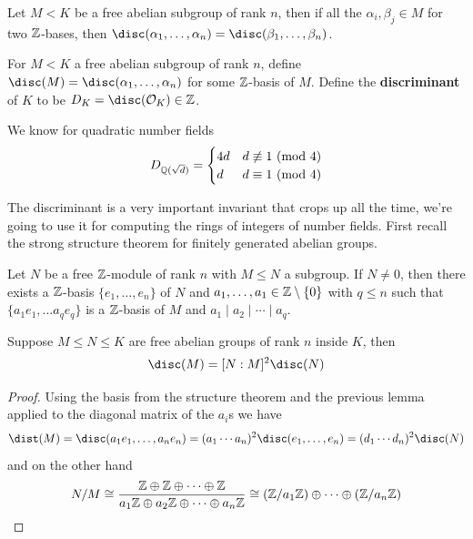 \documentclass{article}
\begin{document}
\begin{corollary}
    Let $M<K$ be a free abelian subgroup of rank $n$, then if all the $\alpha_i,\beta_j\in M$ for two $\mathbb{Z}$-bases, then $\disc(\alpha_1,\ldots,\alpha_n)=\disc(\beta_1,\ldots,\beta_n)$.
\end{corollary}

\begin{definition}
    For $M< K$ a free abelian subgroup of rank $n$, define $\disc(M)=\disc(\alpha_1,\ldots,\alpha_n)$ for some $\mathbb{Z}$-basis of $M$. Define the \textbf{discriminant} of $K$ to be $D_K=\disc(\cO_K)\in\bZ$.
\end{definition}

We know for quadratic number fields \[
D_{\mathbb{Q}(\sqrt{d})} = \begin{cases}
    4d & d\not\equiv 1 \text{ (mod $4$)}\\
    d & d\equiv 1 \text{ (mod $4$)}
\end{cases}
\]

The discriminant is a very important invariant that crops up all the time, we're going to use it for computing the rings of integers of number fields. First recall the strong structure theorem for finitely generated abelian groups.

\begin{theorem}
    Let $N$ be a free $\mathbb{Z}$-module of rank $n$ with $M\leq N$ a subgroup. If $N\neq 0$, then there exists a $\mathbb{Z}$-basis $\{e_1,\ldots,e_n\}$ of $N$ and $a_1,\ldots,a_1\in\mathbb{Z}\setminus\{0\}$ with $q\leq n$ such that $\{a_1e_1,\ldots a_qe_q\}$ is a $\mathbb{Z}$-basis of $M$ and $a_1\mid a_2\mid \cdots \mid a_q$.
\end{theorem}

\begin{proposition}
    Suppose $M\leq N \leq K$ are free abelian groups of rank $n$ inside $K$, then \[
    \disc(M) = [N:M]^2\disc(N)
    \]\begin{proof}
        Using the basis from the structure theorem and the previous lemma applied to the diagonal matrix of the $a_i$s we have \[
        \dist(M) = \disc(a_1e_1,\ldots,a_ne_n) = (a_1\cdots a_n)^2\disc(e_1,\ldots,e_n) = (d_1\cdots d_n)^2\disc(N)
        \] and on the other hand \[
        N/M \cong \frac{\mathbb{Z}\oplus \mathbb{Z} \oplus \cdots \oplus \mathbb{Z}}{a_1\mathbb{Z} \oplus a_2\mathbb{Z} \oplus \cdots \oplus a_n\mathbb{Z}} \cong (\mathbb{Z}/a_1\mathbb{Z}) \oplus \cdots \oplus (\mathbb{Z}/a_n\mathbb{Z})\qedhere
        \]
    \end{proof}
\end{proposition}
\end{document}
